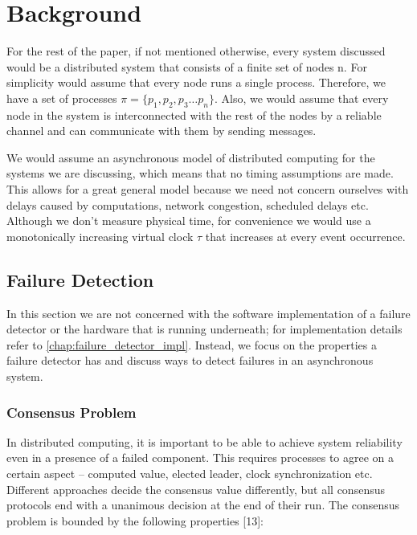 \documentclass[bsc,frontabs,twoside,singlespacing,parskip,deptreport,hidel]{infthesis}     %
\begin{document}
\chapter{Background}

For the rest of the paper, if not mentioned otherwise, every system discussed would be a distributed system that consists of a finite set of nodes n. For simplicity would assume that every node runs a single process. Therefore, we have a set of processes $\pi = \{p_1, p_2, p_3 \dots p_n\}$. Also, we would assume that every node in the system is interconnected with the rest of the nodes by a reliable channel and can communicate with them by sending messages. 

We would assume an asynchronous model of distributed computing for the systems we are discussing, which means that no timing assumptions are made. This allows for a great general model because we need not concern ourselves with delays caused by computations, network congestion, scheduled delays etc. Although we don’t measure physical time, for convenience we would use a monotonically increasing virtual clock $\tau$ that increases at every event occurrence.


\section{Failure Detection}

In this section we are not concerned with the software implementation of a failure detector or the hardware that is running underneath; for implementation details refer to \autoref{chap:failure_detector_impl}. Instead, we focus on the properties a failure detector has and discuss ways to detect failures in an asynchronous system.

\subsection{Consensus Problem}

In distributed computing, it is important to be able to achieve system reliability even in a presence of a failed component. This requires processes to agree on a certain aspect – computed value, elected leader, clock synchronization etc. Different approaches decide the consensus value differently, but all consensus protocols end with a unanimous decision at the end of their run.  The consensus problem is bounded by the following properties [13]:
\end{document}
